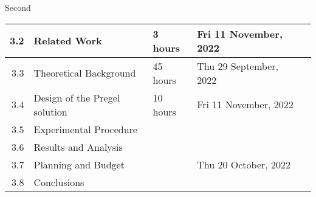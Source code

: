Second\documentclass{standalone}
\begin{document}
\begin{tabular}{|r|llll|}
    3.2                                                           & \multicolumn{1}{l|}{Related Work}                               & \multicolumn{1}{l|}{3 hours}                                   & \multicolumn{1}{l|}{Fri 11 November, 2022}                  &                                                              \\ \hline
    3.3                                                           & \multicolumn{1}{l|}{Theoretical Background}                     & \multicolumn{1}{l|}{45 hours}                                  & \multicolumn{1}{l|}{Thu 29 September, 2022}                 &                                                              \\ \hline
    3.4                                                           & \multicolumn{1}{l|}{Design of the Pregel solution}              & \multicolumn{1}{l|}{10 hours}                                  & \multicolumn{1}{l|}{Fri 11 November, 2022}                  &                                                              \\ \hline
    3.5                                                           & \multicolumn{1}{l|}{Experimental Procedure}                     & \multicolumn{1}{l|}{}                                          & \multicolumn{1}{l|}{}                                       &                                                              \\ \hline
    3.6                                                           & \multicolumn{1}{l|}{Results and Analysis}                       & \multicolumn{1}{l|}{}                                          & \multicolumn{1}{l|}{}                                       &                                                              \\ \hline
    3.7                                                           & \multicolumn{1}{l|}{Planning and Budget}                        & \multicolumn{1}{l|}{}                                          & \multicolumn{1}{l|}{Thu 20 October, 2022}                   &                                                              \\ \hline
    3.8                                                           & \multicolumn{1}{l|}{Conclusions}                                & \multicolumn{1}{l|}{}                                          & \multicolumn{1}{l|}{}                                       &                                                              \\ \hline

\end{tabular}
\end{document}
